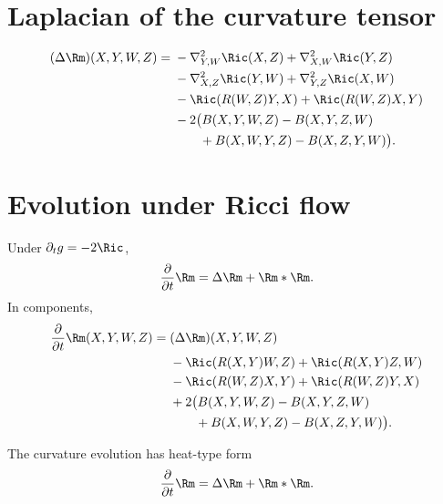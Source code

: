 \section{Laplacian of the curvature tensor}

\begin{proposition}
\label{topping:laplacian-curvature-tensor}

\begin{align*}
(\Delta\Rm)(X,Y,W,Z)={}&-\nabla^2_{Y,W}\Ric(X,Z)+\nabla^2_{X,W}\Ric(Y,Z)\\
&-\nabla^2_{X,Z}\Ric(Y,W)+\nabla^2_{Y,Z}\Ric(X,W)\\
&-\Ric(R(W,Z)Y,X)+\Ric(R(W,Z)X,Y)\\
&-2\bigl(B(X,Y,W,Z)-B(X,Y,Z,W)\\
&\qquad+B(X,W,Y,Z)-B(X,Z,Y,W)\bigr).
\end{align*}
\end{proposition}

\section{Evolution under Ricci flow}

\begin{proposition}
\label{topping:ricci-flow-curvature-evolution}

Under $\partial_tg=-2\Ric$,
\[
\frac{\partial}{\partial t}\Rm=\Delta\Rm+\Rm*\Rm.
\]
In components,
\begin{align*}
\frac{\partial}{\partial t}\Rm(X,Y,W,Z)={}&(\Delta\Rm)(X,Y,W,Z)\\
&-\Ric(R(X,Y)W,Z)+\Ric(R(X,Y)Z,W)\\
&-\Ric(R(W,Z)X,Y)+\Ric(R(W,Z)Y,X)\\
&+2\bigl(B(X,Y,W,Z)-B(X,Y,Z,W)\\
&\qquad+B(X,W,Y,Z)-B(X,Z,Y,W)\bigr).
\end{align*}
\end{proposition}

\begin{remark}
\label{topping:ricci-flow-curvature-heat}

The curvature evolution has heat-type form
\[
\frac{\partial}{\partial t}\Rm=\Delta\Rm+\Rm*\Rm.
\]
\end{remark}


